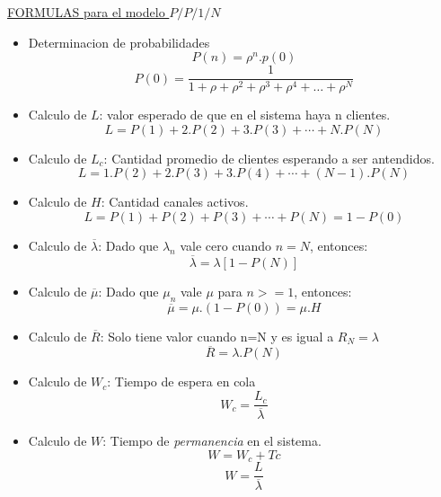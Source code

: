 \documentclass{article}
\begin{document}
\noindent
\underline{FORMULAS para el modelo \(P/P/1/N\)}
\begin{itemize}
    \item Determinacion de probabilidades
        \begin{equation} \label{eu_eqn}
            P(n) = \rho^n . p(0)
        \end{equation}
        \begin{equation} \label{eu_eqn}
            P(0) = \frac{1}{1+\rho+\rho^2+\rho^3+\rho^4+\dots+\rho^N}
        \end{equation}
    \item Calculo de \(L\): valor esperado de que en el sistema haya n clientes.
        \begin{equation} \label{eu_eqn}
            L = P(1) + 2.P(2) + 3.P(3) + \cdots + N.P(N)
        \end{equation}
    \item Calculo de \(L_c\): Cantidad promedio de clientes esperando a ser antendidos.
        \begin{equation} \label{eu_eqn}
            L = 1.P(2) + 2.P(3) + 3.P(4) + \cdots + (N-1).P(N)
        \end{equation}
    \item Calculo de \(H\): Cantidad canales activos.
        \begin{equation} \label{eu_eqn}
            L = P(1) + P(2) + P(3) + \cdots + P(N) = 1 - P(0)
        \end{equation}
    \item Calculo de \(\overline{\lambda}\): 
        Dado que \(\lambda_n\) vale cero cuando \(n=N\), entonces:
        \begin{equation} \label{eu_eqn}
            \overline{\lambda} = \lambda[1-P(N)]
        \end{equation}  
    \item Calculo de \(\overline{\mu}\): 
        Dado que \(\mu_n\) vale \(\mu\) para \(n>=1\), entonces:
        \begin{equation} \label{eu_eqn}
            \overline{\mu} = \mu.(1-P(0)) = \mu.H
        \end{equation}  
    \item Calculo de \(\overline{R}\): 
        Solo tiene valor cuando n=N y es igual a \(R_N = \lambda\)
        \begin{equation} \label{eu_eqn}
            \overline{R} = \lambda.P(N)
        \end{equation}  
    \item Calculo de \(W_c\): Tiempo de espera en cola
        \begin{equation}
            W_c = \frac{L_c}{\overline{\lambda}}
        \end{equation}  
    \item Calculo de \(W\): Tiempo de \textit{permanencia} en el sistema.
        \begin{equation} \label{eu_eqn}
            W = W_c+Tc 
        \end{equation}  
        \begin{equation} \label{eu_eqn}
            W = \frac{L}{\overline{\lambda}} 
        \end{equation}
    \end{itemize}
\end{document}
